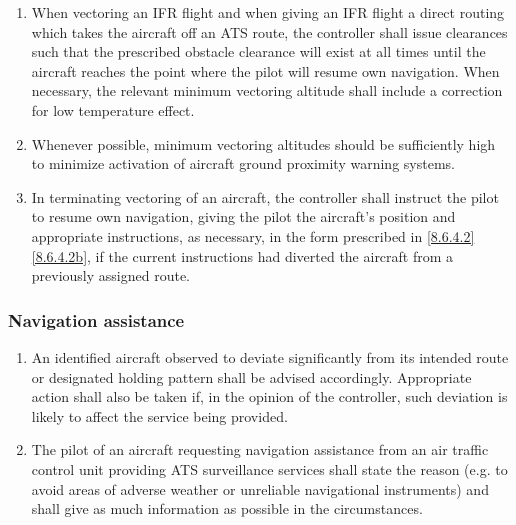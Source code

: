 \begin{enumerate}
    \item When vectoring an IFR flight and when giving an IFR flight a direct routing which takes the aircraft off an ATS route, the controller shall issue clearances such that the prescribed obstacle clearance will exist at all times until the aircraft reaches the point where the pilot will resume own navigation. When necessary, the relevant minimum vectoring altitude shall include a correction for low temperature effect.
    \item Whenever possible, minimum vectoring altitudes should be sufficiently high to minimize activation of aircraft ground proximity warning systems.
    \item \label{8.6.5.5} In terminating vectoring of an aircraft, the controller shall instruct the pilot to resume own navigation, giving the pilot the aircraft's position and appropriate instructions, as necessary, in the form prescribed in \ref{8.6.4.2} \ref{8.6.4.2b}, if the current instructions had diverted the aircraft from a previously assigned route.
\end{enumerate}

\subsubsection{Navigation assistance}

\begin{enumerate}
    \item An identified aircraft observed to deviate significantly from its intended route or designated holding pattern shall be advised accordingly. Appropriate action shall also be taken if, in the opinion of the controller, such deviation is likely to affect the service being provided.
    \item The pilot of an aircraft requesting navigation assistance from an air traffic control unit providing ATS surveillance services shall state the reason (e.g. to avoid areas of adverse weather or unreliable navigational instruments) and shall give as much information as possible in the circumstances.
\end{enumerate}


